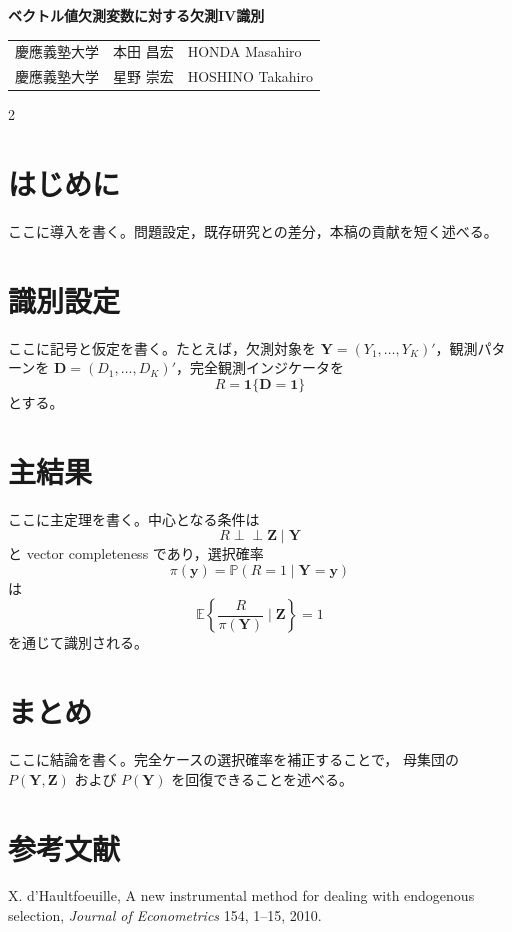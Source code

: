 \documentclass[dvipdfmx,autodetect-engine,a4paper,10pt]{jsarticle}
\newcommand{\E}{\mathbb E}
\newcommand{\Prb}{\mathbb P}
\newcommand{\indep}{\mathrel{\perp\!\!\!\perp}}
\newcommand{\papertitle}{%
  ベクトル値欠測変数に対する欠測IV識別
}
\newcommand{\authorblock}{%
  \begin{tabular}{lll}
    慶應義塾大学 & 本田 昌宏 & HONDA Masahiro\\
    慶應義塾大学 & 星野 崇宏 & HOSHINO Takahiro\\
  \end{tabular}
}
\begin{document}
\vspace*{12mm}

\begin{center}
  {\Large\bfseries \papertitle\par}
  \vspace{6mm}
  {\normalsize \authorblock}
\end{center}

\vspace{4mm}

\begin{multicols}{2}

\section{はじめに}
ここに導入を書く。問題設定，既存研究との差分，本稿の貢献を短く述べる。

\section{識別設定}
ここに記号と仮定を書く。たとえば，欠測対象を
\(\bm Y=(Y_1,\ldots,Y_K)'\)，観測パターンを
\(\bm D=(D_1,\ldots,D_K)'\)，完全観測インジケータを
\[
R=\mathbf 1\{\bm D=\bm 1\}
\]
とする。

\section{主結果}
ここに主定理を書く。中心となる条件は
\[
R\indep \bm Z\mid \bm Y
\]
と vector completeness であり，選択確率
\[
\pi(\bm y)=\Prb(R=1\mid \bm Y=\bm y)
\]
は
\[
\E\left\{\frac{R}{\pi(\bm Y)}\mid \bm Z\right\}=1
\]
を通じて識別される。

\section{まとめ}
ここに結論を書く。完全ケースの選択確率を補正することで，
母集団の \(P(\bm Y,\bm Z)\) および \(P(\bm Y)\) を回復できることを述べる。

\section*{参考文献}
\begin{enumerate}[label={[\arabic*]},leftmargin=1.7em,itemsep=0pt,topsep=0pt]
  \item X. d'Haultfoeuille, A new instrumental method for dealing with
  endogenous selection, \textit{Journal of Econometrics} 154, 1--15, 2010.
\end{enumerate}

\end{multicols}
\end{document}
